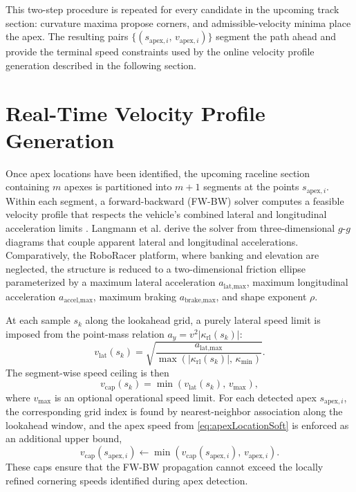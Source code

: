 This two-step procedure is repeated for every candidate in the upcoming track section: curvature maxima propose corners, and admissible-velocity minima place the apex.
The resulting pairs $\{(s_{\text{apex},i},\, v_{\text{apex},i})\}$ segment the path ahead and provide the terminal speed constraints used by the online velocity profile generation described in the following section.

\section{Real-Time Velocity Profile Generation}
\label{section:OnlineVelocityProfile}

Once apex locations have been identified, the upcoming raceline section containing $m$ apexes is partitioned into $m+1$ segments at the points $s_{\text{apex},i}$.
Within each segment, a forward-backward (FW-BW) solver computes a feasible velocity profile that respects the vehicle's combined lateral and longitudinal acceleration limits \cite{langmann_OnlineVelocityProfile_2025, heilmeier_MinimumCurvatureTrajectory_2020}.
Langmann et al. \cite{langmann_OnlineVelocityProfile_2025} derive the solver from three-dimensional $g$-$g$ diagrams that couple apparent lateral and longitudinal accelerations.
Comparatively, the RoboRacer platform, where banking and elevation are neglected, the structure is reduced to a two-dimensional friction ellipse parameterized by a maximum lateral acceleration $a_{\text{lat,max}}$, maximum longitudinal acceleration $a_{\text{accel,max}}$, maximum braking $a_{\text{brake,max}}$, and shape exponent $\rho$.

At each sample $s_k$ along the lookahead grid, a purely lateral speed limit is imposed from the point-mass relation $a_y = v^2 |\kappa_{\text{rl}}(s_k)|$:
\begin{equation}
    v_{\text{lat}}(s_k) = \sqrt{\frac{a_{\text{lat,max}}}{\max\!\left(\left|\kappa_{\text{rl}}(s_k)\right|,\, \kappa_{\min}\right)}}.
    \label{eq:vLatCap}
\end{equation}
The segment-wise speed ceiling is then
\begin{equation}
    v_{\text{cap}}(s_k) = \min\!\left(v_{\text{lat}}(s_k),\, v_{\text{max}}\right),
    \label{eq:vCap}
\end{equation}
where $v_{\text{max}}$ is an optional operational speed limit.
For each detected apex $s_{\text{apex},i}$, the corresponding grid index is found by nearest-neighbor association along the lookahead window, and the apex speed from \eqref{eq:apexLocationSoft} is enforced as an additional upper bound,
\begin{equation}
    v_{\text{cap}}(s_{\text{apex},i}) \leftarrow \min\!\left(v_{\text{cap}}(s_{\text{apex},i}),\, v_{\text{apex},i}\right).
    \label{eq:apexCap}
\end{equation}
These caps ensure that the FW-BW propagation cannot exceed the locally refined cornering speeds identified during apex detection.


